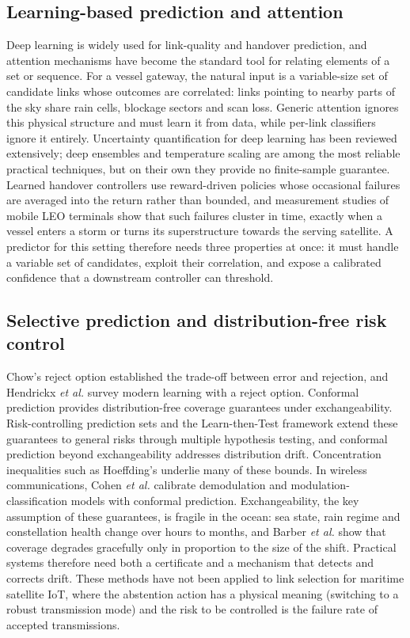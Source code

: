 \subsection{Learning-based prediction and attention}
Deep learning is widely used for link-quality and handover prediction, and attention mechanisms have become the standard tool for relating elements of a set or sequence\cite{brauwers2023}. For a vessel gateway, the natural input is a variable-size set of candidate links whose outcomes are correlated: links pointing to nearby parts of the sky share rain cells, blockage sectors and scan loss. Generic attention ignores this physical structure and must learn it from data, while per-link classifiers ignore it entirely. Uncertainty quantification for deep learning has been reviewed extensively\cite{abdar2021}; deep ensembles and temperature scaling are among the most reliable practical techniques, but on their own they provide no finite-sample guarantee. Learned handover controllers\cite{chen2024ho,chen2026sr} use reward-driven policies whose occasional failures are averaged into the return rather than bounded, and measurement studies of mobile LEO terminals\cite{laniewski2024} show that such failures cluster in time, exactly when a vessel enters a storm or turns its superstructure towards the serving satellite. A predictor for this setting therefore needs three properties at once: it must handle a variable set of candidates, exploit their correlation, and expose a calibrated confidence that a downstream controller can threshold.

\subsection{Selective prediction and distribution-free risk control}
Chow's reject option\cite{chow1970} established the trade-off between error and rejection, and Hendrickx \emph{et al.}\cite{hendrickx2024} survey modern learning with a reject option. Conformal prediction provides distribution-free coverage guarantees under exchangeability\cite{vovk2022,angelopoulos2023}. Risk-controlling prediction sets\cite{bates2021} and the Learn-then-Test framework\cite{angelopoulos2025} extend these guarantees to general risks through multiple hypothesis testing, and conformal prediction beyond exchangeability addresses distribution drift\cite{barber2023}. Concentration inequalities such as Hoeffding's\cite{hoeffding1963} underlie many of these bounds. In wireless communications, Cohen \emph{et al.}\cite{cohen2023} calibrate demodulation and modulation-classification models with conformal prediction. Exchangeability, the key assumption of these guarantees, is fragile in the ocean: sea state, rain regime and constellation health change over hours to months, and Barber \emph{et al.}\cite{barber2023} show that coverage degrades gracefully only in proportion to the size of the shift. Practical systems therefore need both a certificate and a mechanism that detects and corrects drift. These methods have not been applied to link selection for maritime satellite IoT, where the abstention action has a physical meaning (switching to a robust transmission mode) and the risk to be controlled is the failure rate of accepted transmissions.

